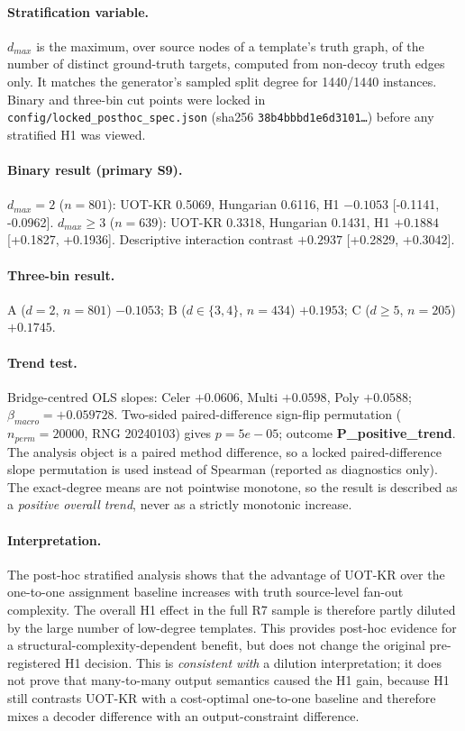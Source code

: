 \paragraph{Stratification variable.} $d_{max}$ is the maximum, over source nodes of a
template's truth graph, of the number of distinct ground-truth targets, computed from
non-decoy truth edges only. It matches the generator's sampled split degree for
1440/1440 instances. Binary and
three-bin cut points were locked in \texttt{config/locked\_posthoc\_spec.json}
(sha256 \texttt{38b4bbbd1e6d3101\ldots}) before any stratified H1 was viewed.

\paragraph{Binary result (primary S9).}
$d_{max}=2$ ($n=801$): UOT-KR 0.5069,
Hungarian 0.6116, H1 $-0.1053$
[-0.1141, -0.0962].
$d_{max}\ge 3$ ($n=639$): UOT-KR
0.3318, Hungarian 0.1431,
H1 $+0.1884$
[+0.1827, +0.1936].
Descriptive interaction contrast $+0.2937$
[+0.2829, +0.3042].

\paragraph{Three-bin result.} A ($d=2$, $n=801$)
$-0.1053$; B ($d\in\{3,4\}$, $n=434$)
$+0.1953$; C ($d\ge 5$, $n=205$)
$+0.1745$.

\paragraph{Trend test.} Bridge-centred OLS slopes:
Celer $+0.0606$, Multi $+0.0598$,
Poly $+0.0588$; $\beta_{macro} = +0.059728$.
Two-sided paired-difference sign-flip permutation ($n_{perm}=20000$,
RNG 20240103) gives $p = 5e-05$; outcome
\textbf{P_positive_trend}. The analysis object is a paired method difference, so a locked
paired-difference slope permutation is used instead of Spearman (reported as diagnostics
only). The exact-degree means are not pointwise monotone, so the result is described as a
\emph{positive overall trend}, never as a strictly monotonic increase.

\paragraph{Interpretation.} The post-hoc stratified analysis shows that the advantage of UOT-KR over the one-to-one assignment baseline increases with truth source-level fan-out complexity. The overall H1 effect in the full R7 sample is therefore partly diluted by the large number of low-degree templates. This provides post-hoc evidence for a structural-complexity-dependent benefit, but does not change the original pre-registered H1 decision. This is \emph{consistent with} a dilution
interpretation; it does not prove that many-to-many output semantics caused the H1 gain,
because H1 still contrasts UOT-KR with a cost-optimal one-to-one baseline and therefore
mixes a decoder difference with an output-constraint difference.


